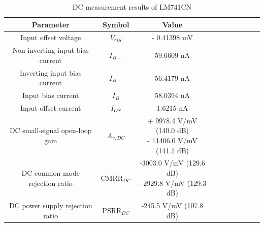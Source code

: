 \documentclass[UTF8]{article}
\begin{document}
\begin{table}[H]\centering
    \caption{DC measurement results of LM741CN}
\begin{tabular}{cccccccccc}\toprule
    Parameter & Symbol & Value \\
    \midrule
    Input offset voltage             & $V_{OS}$                &  - 0.41398 mV \\
    Non-inverting input bias current & $I_{B+}$                &  59.6609 nA \\
    Inverting input bias current     & $I_{B-}$                &  56.4179 nA \\
    Input bias current               & $I_B$                   &  58.0394 nA \\
    Input offset current             & $I_{OS}$                &  1.6215 nA \\
    DC small-signal open-loop gain   & $A_{v,DC}$              &   \makecell{+ 9978.4 V/mV (140.0 dB) \\ - 11406.0 V/mV (141.1 dB)} \\
    DC common-mode rejection ratio   & $\mathrm{CMRR}_{DC}$    &  \makecell{-3003.0 V/mV (129.6 dB) \\ - 2929.8 V/mV (129.3 dB)} \\
    DC power supply rejection ratio  & $\mathrm{PSRR}_{DC}$    &  -245.5 V/mV (107.8 dB) \\
    \bottomrule
\end{tabular}
\end{table}
\end{document}
